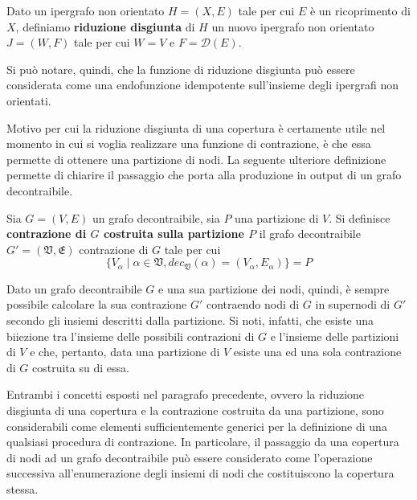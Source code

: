 \begin{definition}
    Dato un ipergrafo non orientato $H = (X, E)$ tale per cui $E$ \`e un ricoprimento di $X$,
    definiamo \textbf{riduzione disgiunta} di $H$ un nuovo ipergrafo non orientato $J = (W, F)$
    tale per cui $W = V$ e $F = \mathcal{D}(E)$.
\end{definition}

Si pu\`o notare, quindi, che la funzione di riduzione disgiunta pu\`o essere considerata come una
endofunzione idempotente sull'insieme degli ipergrafi non orientati.


Motivo per cui la riduzione disgiunta di una copertura è certamente utile nel momento in cui si voglia
realizzare una funzione di contrazione, è che essa permette di ottenere una partizione di nodi.
La seguente ulteriore definizione permette di chiarire il passaggio che porta alla produzione in output di un grafo
decontraibile.

\begin{definition}
Sia $G = (V, E)$ un grafo decontraibile, sia $P$ una partizione di $V$.
Si definisce \textbf{contrazione di $G$ costruita sulla partizione $P$} il grafo decontraibile
$G' = (\mathfrak{V}, \mathfrak{E})$ contrazione di $G$ tale per cui
    \begin{equation*}
        \{V_\alpha \mid \alpha \in \mathfrak{V}, dec_{\mathfrak{V}}(\alpha) = (V_\alpha, E_\alpha)\} = P
    \end{equation*}
\end{definition}

Dato un grafo decontraibile $G$ e una sua partizione dei nodi, quindi, è sempre possibile calcolare la sua
contrazione $G'$ contraendo nodi di $G$ in supernodi di $G'$ secondo gli insiemi descritti dalla partizione.
Si noti, infatti, che esiste una biiezione tra l'insieme delle possibili contrazioni di $G$ e l'insieme delle
partizioni di $V$ e che, pertanto, data una partizione di $V$ esiste una ed una sola contrazione di $G$ costruita
su di essa.

\label{sec:make_decontractible_graph}

Entrambi i concetti esposti nel paragrafo precedente, ovvero la riduzione disgiunta di una copertura e la
contrazione costruita da una partizione, sono considerabili come elementi sufficientemente generici
per la definizione di una qualsiasi procedura di contrazione.
In particolare, il passaggio da una copertura
di nodi ad un grafo decontraibile può essere considerato come l'operazione successiva all'enumerazione degli
insiemi di nodi che costituiscono la copertura stessa. \newline

